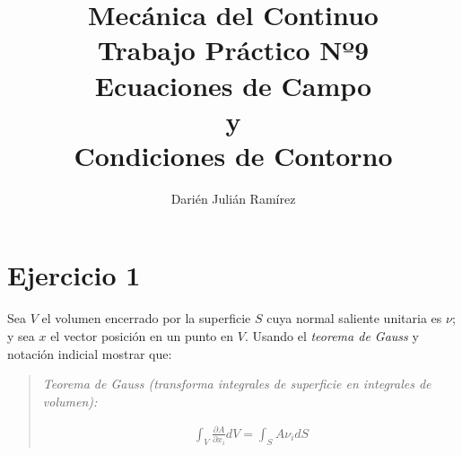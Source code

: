 \documentclass[a4paper,10pt,twoside,final,spanish]{article}
\title{\Huge\usefont{T1}{lmss}{b}{n} Mecánica del Continuo \\
			 Trabajo Práctico Nº9  \\
			 Ecuaciones de Campo \\ y \\ Condiciones de Contorno}
\author{Darién Julián Ramírez}
\date{}
\begin{document}
\maketitle %

\section*{Ejercicio 1}

Sea $V$ el volumen encerrado por la superficie $S$ cuya normal saliente unitaria es $\nu$; y sea $x$ el vector posición en un punto en $V$. Usando el \textit{teorema de Gauss} y notación indicial mostrar que: \\

\begin{quote}
\begin{tcolorbox}[colback=gray!10!white,colframe=black!0!white]

\textit{Teorema de Gauss (transforma integrales de superficie en integrales de volumen):}

\begin{align*}
\int_{V}\frac{\partial A}{\partial x_{i}}dV=\int_{S}A\nu_{i}dS
\end{align*}

\end{tcolorbox}
\end{quote}
\end{document}
